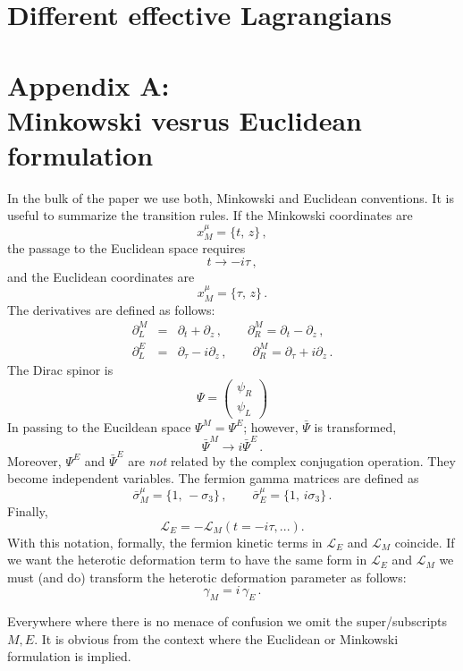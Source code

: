 \documentclass[epsfig,12pt]{article}
\def\beq{\begin{equation}}
\def\eeq{\end{equation}}
\def\beqn{\begin{eqnarray}}
\def\eeqn{\end{eqnarray}}
\newcommand{\cell}{{\mathcal L}}
\newcommand{\pt}{\partial}
\renewcommand{\theequation}{\thesection.\arabic{equation}}
\def\beqn{\begin{eqnarray}}
\def\eeqn{\end{eqnarray}}
\def\beq{\begin{equation}}
\def\eeq{\end{equation}}
\renewcommand{\theequation}{\thesection.\arabic{equation}}
\begin{document}
\newpage

\section{Different effective Lagrangians}

\newpage

\section*{Appendix A: \\
Minkowski vesrus Euclidean formulation}
 \renewcommand{\theequation}{A.\arabic{equation}}
\setcounter{equation}{0}
 
 \renewcommand{\thesubsection}{A.\arabic{subsection}}
\setcounter{subsection}{0}

In the bulk of the paper we use both, Minkowski and Euclidean conventions.
It is useful to summarize the transition rules.
If the Minkowski coordinates are
\beq
x^\mu_M =\{t,\,z\}\,,
\eeq
the passage to the Euclidean space requires
\beq
t \to - i\tau\,,
\eeq
and the Euclidean coordinates are
\beq
x^\mu_M =\{\tau,\,z\}\,.
\eeq
The derivatives are defined as follows:
\beqn
\pt_L^M &=& \pt_t+\pt_z\,,\qquad \pt_R^M = \pt_t- \pt_z\,,
\nonumber\\[2mm]
\pt_L^E &=& \pt_\tau - i \pt_z\,,\qquad \pt_R^M = \pt_\tau + i \pt_z\,.
\eeqn
The Dirac spinor is
\beq
\Psi =\left(
\begin{array}{c}
\psi_R\\[1mm]
\psi_L
\end{array}
\right)
\eeq
In passing to the Eucildean space $\Psi^M = \Psi^E$;
however, $\bar\Psi$ is transformed,
\beq
\bar\Psi^M \to i \bar \Psi^E\,.
\eeq
Moreover, $\Psi^E$ and $\bar \Psi^E$ are {\em not} related by the complex conjugation operation.
They become independent variables. The fermion gamma matrices are defined as
\beq
\bar\sigma^\mu_M =\{1,\,-\sigma_3\}\,,\qquad \bar\sigma^\mu_E =\{1,\, i\sigma_3\}\,.
\eeq
Finally, 
\beq
\cell_E =- \cell_M (t=-i\tau , ...).
\eeq
With this notation, formally, the fermion kinetic terms in $\cell_E $ and $\cell_M $
coincide.
If we want the heterotic deformation term to have the same form in
$\cell_E $ and $\cell_M $ we must (and do) transform the heterotic deformation parameter as follows:
\beq
\gamma_M = i\,\gamma_E\,.
\eeq

Everywhere where there is no menace of confusion we omit the super/sub\-scripts $M,E$.
It is obvious from the context where the Euclidean or Minkowski formulation is implied.
\end{document}
